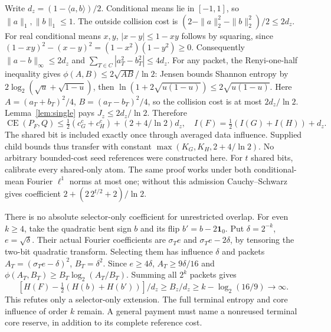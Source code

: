 \documentclass[11pt]{article}
\newcommand{\CE}{\operatorname{CE}}
\begin{document}
Write $d_z=(1-\langle a,b\rangle)/2$. Conditional means lie in $[-1,1]$,
so $\|a\|_1,\|b\|_1\le1$. The outside collision cost is
$(2-\|a\|_2^2-\|b\|_2^2)/2\le2d_z$.
For real conditional means $x,y$, $|x-y|\le1-xy$ follows by squaring,
since $(1-xy)^2-(x-y)^2=(1-x^2)(1-y^2)\ge0$.
Consequently $\|a-b\|_\infty\le2d_z$ and
$\sum_{T\in C}|a_T^2-b_T^2|\le4d_z$.
For any packet, the Renyi-one-half inequality gives
$\phi(A,B)\le2\sqrt{AB}/\ln2$:
Jensen bounds Shannon entropy by $2\log_2(\sqrt u+\sqrt{1-u})$,
then $\ln(1+2\sqrt{u(1-u)})\le2\sqrt{u(1-u)}$.
Here $A=(a_T+b_T)^2/4$, $B=(a_T-b_T)^2/4$,
so the collision cost is at most $2d_z/\ln2$.
Lemma~\ref{lem:single} pays $J_z\le2d_z/\ln2$. Therefore
\[
 \CE(P_F,Q)\le\tfrac12(c_G^c+c_H^c)+(2+4/\ln2)d_z,\quad
 I(F)=\tfrac12(I(G)+I(H))+d_z.
\]
The shared bit is included exactly once through averaged data influence.
Supplied child bounds thus transfer with constant $\max(K_G,K_H,2+4/\ln2)$.
No arbitrary bounded-cost seed references were constructed here.
For $t$ shared bits, calibrate every shared-only atom. The same proof
works under both conditional-mean Fourier $\ell^1$ norms at most one;
without this admission Cauchy--Schwarz gives coefficient
$2+(2\,2^{t/2}+2)/\ln2$.

There is no absolute selector-only coefficient for unrestricted overlap.
For even $k\ge4$, take the quadratic bent sign $b$ and its flip
$b'=b-2\mathbf1_0$. Put $\delta=2^{-k}$, $e=\sqrt\delta$.
Their actual Fourier coefficients are $\sigma_Te$ and $\sigma_Te-2\delta$,
by tensoring the two-bit quadratic transform. Selecting them has influence
$\delta$ and packets $A_T=(\sigma_Te-\delta)^2$, $B_T=\delta^2$.
Since $e\ge4\delta$, $A_T\ge9\delta/16$ and
$\phi(A_T,B_T)\ge B_T\log_2(A_T/B_T)$.
Summing all $2^k$ packets gives
\[
 [H(F)-\tfrac12(H(b)+H(b'))]/d_z\ge B_z/d_z
 \ge k-\log_2(16/9)\longrightarrow\infty.
\]
This refutes only a selector-only extension. The full terminal entropy and
core influence of order $k$ remain. A general payment must name a
nonreused terminal core reserve, in addition to its complete reference cost.
\end{document}
